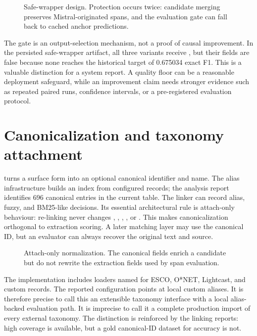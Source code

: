 \begin{figure}[H]
\centering

\caption{Safe-wrapper design. Protection occurs twice: candidate merging preserves Mistral-originated spans, and the evaluation gate can fall back to cached anchor predictions.}
\label{fig:safe-wrapper}
\end{figure}

The gate is an output-selection mechanism, not a proof of causal improvement. In the persisted safe-wrapper artifact, all three variants receive , but their  fields are false because none reaches the historical target of 0.675034 exact F1. This is a valuable distinction for a system report. A quality floor can be a reasonable deployment safeguard, while an improvement claim needs stronger evidence such as repeated paired runs, confidence intervals, or a pre-registered evaluation protocol.

\section{Canonicalization and taxonomy attachment}

 turns a surface form into an optional canonical identifier and name. The alias infrastructure builds an index from configured records; the analysis report identifies 696 canonical entries in the current table. The linker can record alias, fuzzy, and BM25-like decisions. Its essential architectural rule is attach-only behaviour: re-linking never changes , , , , or . This makes canonicalization orthogonal to extraction scoring. A later matching layer may use the canonical ID, but an evaluator can always recover the original text and source.

\begin{figure}[H]
\centering

\caption{Attach-only normalization. The canonical fields enrich a candidate but do not rewrite the extraction fields used by span evaluation.}
\label{fig:normalization}
\end{figure}

The implementation includes loaders named for ESCO, O*NET, Lightcast, and custom records. The reported configuration points at local custom aliases. It is therefore precise to call this an extensible taxonomy interface with a local alias-backed evaluation path. It is imprecise to call it a complete production import of every external taxonomy. The distinction is reinforced by the linking reports: high coverage is available, but a gold canonical-ID dataset for accuracy is not.

